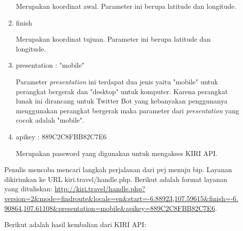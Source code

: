 \begin{itemize}
\begin{enumerate}
		Merupakan koordinat awal. Parameter ini berupa latitude dan longitude.
		\item finish
		
		Merupakan koordinat tujuan. Parameter ini berupa latitude dan longitude.
		\item presentation : "mobile"
		
		Parameter \textit{presentation} ini terdapat dua jenis yaitu "mobile" untuk perangkat bergerak dan "desktop" untuk komputer. Karena perangkat lunak ini dirancang untuk Twitter Bot yang kebanyakan penggunanya menggunakan perangkat bergerak maka parameter dari \textit{presentation} yang cocok adalah "mobile".
		\item apikey : 889C2C8FBB82C7E6
		
		Merupakan password yang digunakan untuk mengakses KIRI API.
	\end{enumerate}
	
	Penulis mencoba mencari langkah perjalanan dari pvj menuju bip. Layanan dikirimkan ke URL kiri.travel/handle.php. Berikut adalah format layanan yang dituliskan:
	\url{http://kiri.travel/handle.php?version=2\&mode=findroute\&locale=en\&start=-6.88923,107.59615\&finish=-6.90864,107.61108\&presentation=mobile\&apikey=889C2C8FBB82C7E6}.
	
	Berikut adalah hasil kembalian dari KIRI API:
	

\end{itemize}
